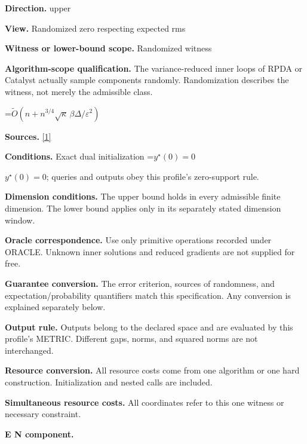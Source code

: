 \documentclass[10pt,a4paper]{article}
\newcommand{\AtlasMath}[1]{\par\begingroup\centering\setbox0=\hbox{$\displaystyle #1$}\ifdim\wd0>1.4\linewidth\typeout{ATLAS WIDE FORMULA: \the\wd0}\fi\ifdim\wd0>\linewidth\resizebox{\linewidth}{!}{\box0}\else\box0\fi\par\endgroup}
\newcommand{\AtlasInlineMath}[1]{\begingroup\setbox0=\hbox{$#1$}\ifdim\wd0>.4\linewidth\endgroup\AtlasMath{#1}\else\endgroup$#1$\fi}
\begin{document}
\textbf{Direction.} upper



\textbf{View.} Randomized zero respecting expected rms



\textbf{Witness or lower-bound scope.} Randomized witness



\textbf{Algorithm-scope qualification.} The variance-reduced inner loops of RPDA or Catalyst actually sample components randomly. Randomization describes the witness, not merely the admissible class.



\AtlasMath{\widetilde{O}(n+n^{3/4}\sqrt\kappa\,\beta\Delta/\varepsilon^2)}


\textbf{Sources.} \href{https://arxiv.org/pdf/2610.04944v1}{[1]}



\textbf{Conditions.} Exact dual initialization \AtlasInlineMath{y^\star(0)=0}; queries and outputs obey this profile's zero-support rule.



\textbf{Dimension conditions.} The upper bound holds in every admissible finite dimension. The lower bound applies only in its separately stated dimension window.



\textbf{Oracle correspondence.} Use only primitive operations recorded under ORACLE. Unknown inner solutions and reduced gradients are not supplied for free.



\textbf{Guarantee conversion.} The error criterion, sources of randomness, and expectation/probability quantifiers match this specification. Any conversion is explained separately below.



\textbf{Output rule.} Outputs belong to the declared space and are evaluated by this profile's METRIC. Different gaps, norms, and squared norms are not interchanged.



\textbf{Resource conversion.} All resource costs come from one algorithm or one hard construction. Initialization and nested calls are included.



\textbf{Simultaneous resource costs.} All coordinates refer to this one witness or necessary constraint.



\textbf{E N component.}
\end{document}
